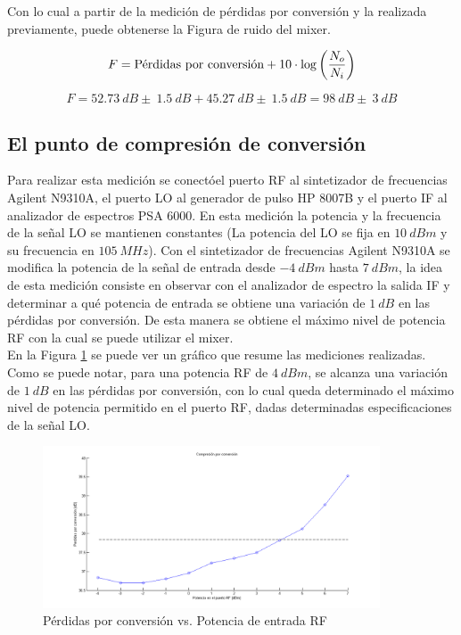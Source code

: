 \documentclass[a4paper,10pt]{article}
\begin{document}
	\indent Con lo cual a partir de la medici\'on de p\'erdidas por conversi\'on
	y la realizada previamente, puede obtenerse la Figura de ruido del mixer.
	
	$$F=\textmd{P\'erdidas por conversi\'on}+10\cdot\log\left(\frac{N_o}{N_i}
	\right)$$
	
	$$F=52.73~dB\pm~1.5~dB+45.27~dB\pm~1.5~dB=98~dB\pm~3~dB$$
	
	\subsection{El punto de compresi\'on de conversi\'on}
	\indent Para realizar esta medici\'on se conect\'oel puerto RF al 
	sintetizador de frecuencias Agilent N9310A, el puerto LO al generador de 
	pulso HP 8007B y el puerto IF al analizador de espectros PSA 6000. En esta 
	medici\'on la potencia y la frecuencia de la se\~nal LO se mantienen 
	constantes (La potencia del LO se fija en $10~dBm$ y su frecuencia en 
	$105~MHz$). Con el sintetizador de frecuencias Agilent N9310A se modifica la
	potencia de la se\~nal de entrada desde $-4~dBm$ hasta $7~dBm$, la idea de 
	esta medici\'on consiste en observar con el analizador de espectro la salida
	IF y determinar a qu\'e potencia de entrada se obtiene una variaci\'on de 
	$1~dB$ en las p\'erdidas por conversi\'on. De esta manera se obtiene el 
	m\'aximo nivel de potencia RF con la cual se puede utilizar el mixer. \\
	\indent En la Figura \ref{compresion} se puede ver un gr\'afico que resume 
	las mediciones realizadas. Como se puede notar, para una potencia RF de 
	$4~dBm$, se alcanza una variaci\'on de $1~dB$ en las p\'erdidas por 
	conversi\'on, con lo cual queda determinado el m\'aximo nivel de potencia 
	permitido en el puerto RF, dadas determinadas especificaciones de la se\~nal
	LO.
	
	\begin{figure}[!htb]
		\centering
		\includegraphics[width=10cm]{Images/compresion.png}
		\caption{P\'erdidas por conversi\'on vs. Potencia de entrada RF}
		\label{compresion}
	\end{figure}	
	
\end{document}
